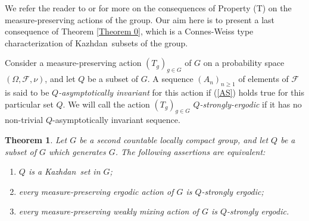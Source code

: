 \documentclass[11pt,english,a4paper]{smfart}
\numberwithin{equation}{section}
\newtheorem{theorem}{Theorem}[section]
\theoremstyle{definition}
\begin{document}
We refer the reader to \cite[Sec.~6.3]{BdHV} or \cite[Ch. 13]{Gl} for more on the consequences of Property (T) on the measure-preserving actions of the group. Our aim here is to present a last consequence of Theorem \ref{Theorem 0}, which is a Connes-Weiss type characterization of  {Kazhdan}\ subsets of the group.
\par\smallskip  
Consider a measure-preserving action $(T_g)_{g\in G}$ of $G$ on a probability space $(\Omega ,\mathcal{F},\nu  )$, and let ${Q}$ be a subset of $G$. A sequence $(A_{n})_{n\ge 1}$ of elements of $\mathcal{F}$ is said to be \emph{${Q}$-asymptotically invariant} for this action if (\ref{AS}) holds true for this particular set ${Q}$.
We will call the action $(T_g)_{g\in G}$ \emph{${Q}$-strongly-ergodic} if it has no non-trivial ${Q}$-asymptotically invariant sequence.
\begin{theorem}\label{Theorem AA}
 Let $G$ be a second countable locally compact group, and let ${Q}$ be a subset of $G$ which generates $G$. The following assertions are equivalent:
\begin{enumerate}
 \item [\emph{(a)}]${Q}$ is a {Kazhdan}\ set in $G$;
\item[\emph{(b)}] every measure-preserving ergodic action of $G$ is ${Q}$-strongly ergodic;
\item[\emph{(c)}] every measure-preserving weakly mixing action of $G$ is ${Q}$-strongly ergodic.
\end{enumerate}
\end{theorem}
\end{document}
